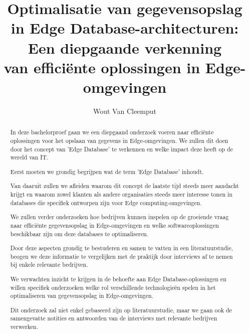 \documentclass{hogent-article}
\title{Optimalisatie van gegevensopslag in Edge Database-architecturen: Een diepgaande verkenning \\ van efficiënte oplossingen in Edge-omgevingen}
\author{Wout Van Cleemput}
\begin{document}
\begin{abstract}
 In deze bachelorproef gaan we een diepgaand onderzoek voeren naar efficiënte oplossingen voor het opslaan 
 van gegevens in Edge-omgevingen.
  We zullen dit doen door het concept van 'Edge Database' te verkennen
  en welke impact deze heeft op de wereld van IT.

Eerst moeten we grondig begrijpen wat de term 'Edge Database' inhoudt.

Van daaruit zullen we afleiden waarom dit concept de laatste tijd steeds meer aandacht krijgt
  en waarom zowel klanten als andere organisaties steeds meer interesse tonen in databases die specifiek ontworpen zijn voor
    Edge computing-omgevingen.
 
We zullen verder onderzoeken hoe bedrijven kunnen inspelen op de groeiende vraag naar efficiënte gegevensopslag in Edge-omgevingen
  en welke softwareoplossingen beschikbaar zijn om deze databases te optimaliseren.

Door deze aspecten grondig te bestuderen en samen te vatten in een literatuurstudie,
 beogen we deze informatie te vergelijken met de praktijk door interviews af te nemen bij enkele relevante bedrijven.

We verwachten inzicht te krijgen in de behoefte aan Edge Database-oplossingen en willen specifiek onderzoeken welke rol
 verschillende technologieën spelen in het optimaliseren van gegevensopslag in Edge-omgevingen.

 Dit onderzoek zal niet enkel gebaseerd zijn op literatuurstudie, maar we gaan ook de samengevatte notities
  en antwoorden van de interviews met relevante bedrijven verwerken.


\end{abstract}

\tableofcontents



\printbibliography[heading=bibintoc]
\end{document}
